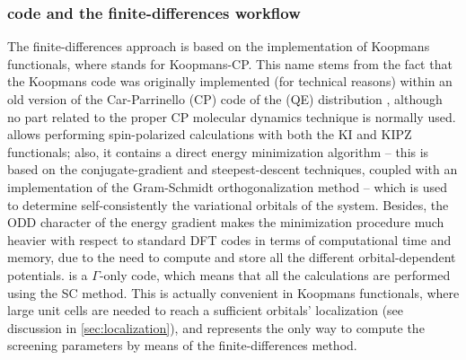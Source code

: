 \subsubsection{\kcp code and the finite-differences workflow}
The finite-differences approach is based on the \kcp implementation of Koopmans functionals, where \kcp stands for Koopmans-CP. This name stems from the fact that the Koopmans code was originally implemented (for technical reasons) within an old version of the Car-Parrinello (CP) code of the \qe (QE) distribution \cite{giannozzi_quantum_2009,giannozzi_advanced_2017}, although no part related to the proper CP molecular dynamics technique is normally used. \kcp allows performing spin-polarized calculations with both the KI and KIPZ functionals; also, it contains a direct energy minimization algorithm -- this is based on the conjugate-gradient and steepest-descent techniques, coupled with an implementation of the Gram-Schmidt orthogonalization method -- which is used to determine self-consistently the variational orbitals of the system. Besides, the ODD character of the energy gradient makes the minimization procedure much heavier with respect to standard DFT codes in terms of computational time and memory, due to the need to compute and store all the different orbital-dependent potentials. \kcp is a $\Gamma$-only code, which means that all the calculations are performed using the SC method. This is actually convenient in Koopmans functionals, where large unit cells are needed to reach a sufficient orbitals' localization (see discussion in \cref{sec:localization}), and represents the only way to compute the screening parameters by means of the finite-differences method. 

